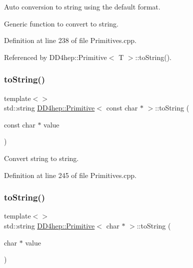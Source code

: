 Auto conversion to string using the default format. 

Generic function to convert to string. 

Definition at line 238 of file Primitives.\+cpp.



Referenced by D\+D4hep\+::\+Primitive$<$ T $>$\+::to\+String().

\hypertarget{struct_d_d4hep_1_1_primitive_aa55fc14c1e3aa75cc5985312bf39ac22}{}\label{struct_d_d4hep_1_1_primitive_aa55fc14c1e3aa75cc5985312bf39ac22} 
\subsubsection{\texorpdfstring{to\+String()}{toString()}\hspace{0.1cm}{\footnotesize\ttfamily [2/4]}}
{\footnotesize\ttfamily template$<$$>$ \\
std\+::string \hyperlink{struct_d_d4hep_1_1_primitive}{D\+D4hep\+::\+Primitive}$<$ const char $\ast$ $>$\+::to\+String (\begin{DoxyParamCaption}\item[{const char $\ast$}]{value }\end{DoxyParamCaption})}



Convert string to string. 



Definition at line 245 of file Primitives.\+cpp.

\hypertarget{struct_d_d4hep_1_1_primitive_af5c270800451a5928940274b7a3142c9}{}\label{struct_d_d4hep_1_1_primitive_af5c270800451a5928940274b7a3142c9} 
\subsubsection{\texorpdfstring{to\+String()}{toString()}\hspace{0.1cm}{\footnotesize\ttfamily [3/4]}}
{\footnotesize\ttfamily template$<$$>$ \\
std\+::string \hyperlink{struct_d_d4hep_1_1_primitive}{D\+D4hep\+::\+Primitive}$<$ char $\ast$ $>$\+::to\+String (\begin{DoxyParamCaption}\item[{char $\ast$}]{value }\end{DoxyParamCaption})}




